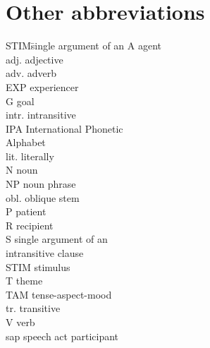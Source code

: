 \section*{Other abbreviations}
	\begin{multicols}{2}
		\begin{tabbing}
		  STIM\hspace{\tabcolsep}\= single argument of an\kill
			A 		\>	agent\\
			adj. 	\>	adjective\\
			adv. 	\>	adverb\\
			EXP 	\>	experiencer\\
			G 		\>	goal\\
			intr. 	\>	intransitive\\
			IPA 	\>	International Phonetic\\
			{}		\>	Alphabet\\
			lit. 	\>	literally\\
			N 		\>	noun\\
			NP 		\>	noun phrase\\
			obl. 	\>	oblique stem\\
			P 		\>	patient\\
			R 		\>	recipient\\
			S 		\>	single argument of an\\
			{}		\>	intransitive clause\\
			STIM 	\>	stimulus\\
			T 		\>	theme\\
			TAM 	\>	tense-aspect-mood\\
			tr. 	\>	transitive\\
			V 		\>	verb\\
			sap 	\>	speech act participant\\
		\end{tabbing}
	\end{multicols}
